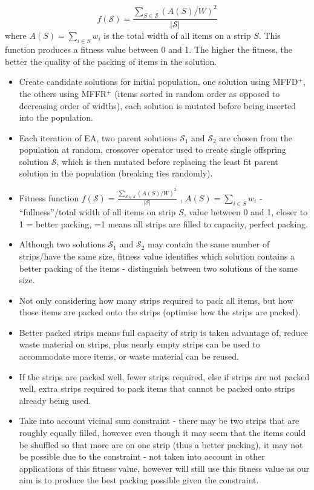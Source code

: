 \documentclass{elsarticle}
\begin{document}
\begin{equation}
	f(\mathcal{S}) = \frac{\sum_{S \in \mathcal{S}} (A(S)/W)^2}{|\mathcal{S}|}
\end{equation}
\noindent where $A(S) = \sum_{i \in S} w_i$ is the total width of all items on a strip $S$. This function produces a fitness value between 0 and 1. The higher the fitness, the better the quality of the packing of items in the solution.

\begin{itemize}
	\item Create candidate solutions for initial population, one solution using MFFD$^+$, the others using MFFR$^+$ (items sorted in random order as opposed to decreasing order of widths), each solution is mutated before being inserted into the population.
	\item Each iteration of EA, two parent solutions $\mathcal{S}_1$ and $\mathcal{S}_2$ are chosen from the population at random, crossover operator used to create single offspring solution $\mathcal{S}$, which is then mutated before replacing the least fit parent solution in the population (breaking ties randomly).
	\item Fitness function $f(\mathcal{S}) = \frac{\sum_{S \in \mathcal{S}} (A(S)/W)^2}{|\mathcal{S}|}$ \cite{falkenauer1992}, $A(S) = \sum_{i \in S} w_i$ - ``fullness''/total width of all items on strip $S$, value between 0 and 1, closer to 1 = better packing, =1 means all strips are filled to capacity, perfect packing.
	\item Although two solutions $\mathcal{S}_1$ and $\mathcal{S}_2$ may contain the same number of strips/have the same size, fitness value identifies which solution contains a better packing of the items - distinguish between two solutions of the same size.
	\item Not only considering how many strips required to pack all items, but how those items are packed onto the strips (optimise how the strips are packed).
	\item Better packed strips means full capacity of strip is taken advantage of, reduce waste material on strips, plus nearly empty strips can be used to accommodate more items, or waste material can be reused.
	\item If the strips are packed well, fewer strips required, else if strips are not packed well, extra strips required to pack items that cannot be packed onto strips already being used.
	\item Take into account vicinal sum constraint - there may be two strips that are roughly equally filled, however even though it may seem that the items could be shuffled so that more are on one strip (thus a better packing), it may not be possible due to the constraint - not taken into account in other applications of this fitness value, however will still use this fitness value as our aim is to produce the best packing possible given the constraint.
\end{itemize}
\end{document}
